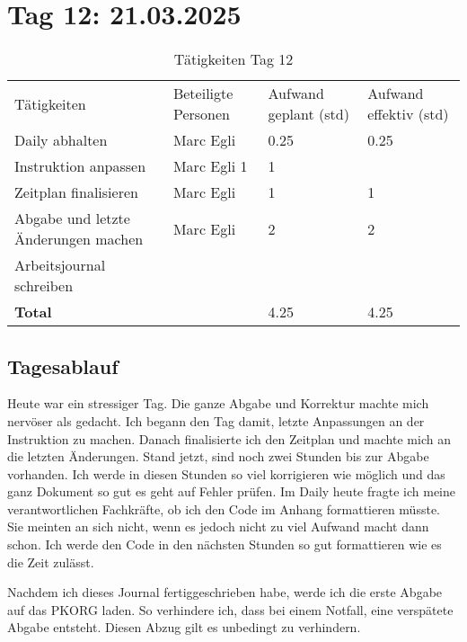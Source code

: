 \section{Tag 12: 21.03.2025}
\begin{table}[H]
    \begin{tabular}{|L{0.4\textwidth}|C{60pt}|C{60pt}|C{60pt}|}
        \hline
        \color{white}Tätigkeiten & \color{white}Beteiligte \color{white}Personen & \color{white}Aufwand geplant (std) & \color{white}Aufwand effektiv (std) \\
        Daily abhalten & Marc Egli & 0.25 & 0.25 \\
        \hline
        Instruktion anpassen & Marc Egli 1 & 1 \\
        \hline
        Zeitplan finalisieren & Marc Egli & 1 & 1 \\
        \hline  
        Abgabe und letzte Änderungen machen & Marc Egli & 2 & 2 \\
        \hline
        Arbeitsjournal schreiben \\
        \hline
        \textbf{Total} &  & 4.25 & 4.25 \\
        \hline
    \end{tabular}
    \caption{Tätigkeiten Tag 12}
\end{table}

\subsection*{Tagesablauf}

Heute war ein stressiger Tag. Die ganze Abgabe und Korrektur machte mich nervöser als gedacht. Ich begann den Tag damit, letzte Anpassungen an der Instruktion zu machen.
Danach finalisierte ich den Zeitplan und machte mich an die letzten Änderungen. Stand jetzt, sind noch zwei Stunden bis zur Abgabe vorhanden. Ich werde in diesen 
Stunden so viel korrigieren wie möglich und das ganz Dokument so gut es geht auf Fehler prüfen. Im Daily heute fragte ich meine verantwortlichen Fachkräfte, ob 
ich den Code im Anhang formattieren müsste. Sie meinten an sich nicht, wenn es jedoch nicht zu viel Aufwand macht dann schon. Ich werde den Code in den nächsten Stunden 
so gut formattieren wie es die Zeit zulässt.

Nachdem ich dieses Journal fertiggeschrieben habe, werde ich die erste Abgabe auf das PKORG laden. So verhindere ich, dass bei einem Notfall, eine verspätete Abgabe entsteht. 
Diesen Abzug gilt es unbedingt zu verhindern. 

